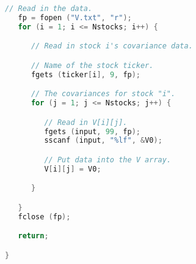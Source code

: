 \documentclass{report}
\begin{document}
\begin{lstlisting}[language=C++]
   // Read in the data.
   fp = fopen ("V.txt", "r");
   for (i = 1; i <= Nstocks; i++) {

      // Read in stock i's covariance data.

      // Name of the stock ticker.
      fgets (ticker[i], 9, fp);

      // The covariances for stock "i".
      for (j = 1; j <= Nstocks; j++) {

         // Read in V[i][j].
         fgets (input, 99, fp);
         sscanf (input, "%lf", &V0);

         // Put data into the V array.
         V[i][j] = V0;

      }

   }
   fclose (fp);

   return;

}
\end{lstlisting}
\pagebreak
\end{document}
